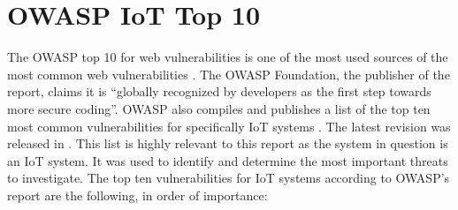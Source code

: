 \section{OWASP IoT Top 10} \label{ch:method:owasp}
The OWASP top 10 for web vulnerabilities is one of the most used sources of the most common web vulnerabilities \cite{owasp-www-top10}. The OWASP Foundation, the publisher of the report, claims it is \enquote{globally recognized by developers as the first step towards more secure coding}. OWASP also compiles and publishes a list of the top ten most common vulnerabilities for specifically IoT systems \cite{owasp-iot-top10}. The latest revision was released in \citeyear{owasp-iot-top10}. This list is highly relevant to this report as the system in question is an IoT system. It was used to identify and determine the most important threats to investigate. The top ten vulnerabilities for IoT systems according to OWASP's report are the following, in order of importance:
